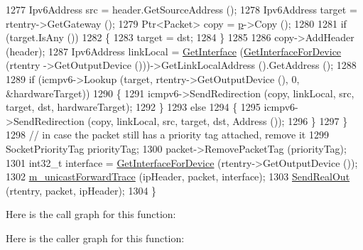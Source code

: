 \begin{DoxyCode}
1277       Ipv6Address src = header.GetSourceAddress ();
1278       Ipv6Address target = rtentry->GetGateway ();
1279       Ptr<Packet> copy = \hyperlink{lte__link__budget_8m_ac9de518908a968428863f829398a4e62}{p}->Copy ();
1280 
1281       \textcolor{keywordflow}{if} (target.IsAny ())
1282         \{
1283           target = dst;
1284         \}
1285 
1286       copy->AddHeader (header);
1287       Ipv6Address linkLocal = \hyperlink{classns3_1_1Ipv6L3Protocol_a2e53b72d76bceb713f2d3cb54e24f5a1}{GetInterface} (\hyperlink{classns3_1_1Ipv6L3Protocol_a878292513d6294e2dfdeccbe1ed1d996}{GetInterfaceForDevice} (rtentry
      ->GetOutputDevice ()))->GetLinkLocalAddress ().GetAddress ();
1288 
1289       \textcolor{keywordflow}{if} (icmpv6->Lookup (target, rtentry->GetOutputDevice (), 0, &hardwareTarget))
1290         \{
1291           icmpv6->SendRedirection (copy, linkLocal, src, target, dst, hardwareTarget);
1292         \}
1293       \textcolor{keywordflow}{else}
1294         \{
1295           icmpv6->SendRedirection (copy, linkLocal, src, target, dst, Address ());
1296         \}
1297     \}
1298   \textcolor{comment}{// in case the packet still has a priority tag attached, remove it}
1299   SocketPriorityTag priorityTag;
1300   packet->RemovePacketTag (priorityTag);
1301   int32\_t \textcolor{keyword}{interface }= \hyperlink{classns3_1_1Ipv6L3Protocol_a878292513d6294e2dfdeccbe1ed1d996}{GetInterfaceForDevice} (rtentry->GetOutputDevice ());
1302   \hyperlink{classns3_1_1Ipv6L3Protocol_a76b5cbe054e52a240d3e1a3ea0f891fd}{m\_unicastForwardTrace} (ipHeader, packet, interface);
1303   \hyperlink{classns3_1_1Ipv6L3Protocol_adad363af4c50cd94505b918b15f228d4}{SendRealOut} (rtentry, packet, ipHeader);
1304 \}
\end{DoxyCode}


Here is the call graph for this function\+:




Here is the caller graph for this function\+:


